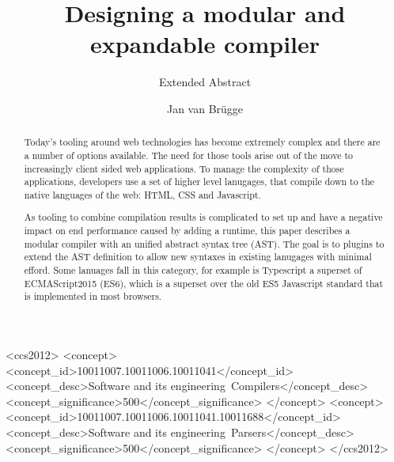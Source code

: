 \documentclass[sigconf, authorversion]{acmart}
\begin{document}
\title{Designing a modular and expandable compiler}
\subtitle{Extended Abstract}

\author{Jan van Br\"ugge}

\begin{abstract}
Today's tooling around web technologies has become extremely complex and there are a number of options available. The need for those tools arise out of the move to increasingly client sided web applications. To manage the complexity of those applications, developers use a set of higher level lanugages, that compile down to the native languages of the web: HTML, CSS and Javascript.

    As tooling to combine compilation results is complicated to set up and have a negative impact on end performance caused by adding a runtime, this paper describes a modular compiler with an unified abstract syntax tree (AST). The goal is to plugins to extend the AST definition to allow new syntaxes in existing lanugages with minimal efford. Some lanuages fall in this category, for example is Typescript a superset of ECMAScript2015 (ES6), which is a superset over the old ES5 Javascript standard that is implemented in most browsers.
\end{abstract}

%
%
\begin{CCSXML}
<ccs2012>
<concept>
<concept_id>10011007.10011006.10011041</concept_id>
<concept_desc>Software and its engineering~Compilers</concept_desc>
<concept_significance>500</concept_significance>
</concept>
<concept>
<concept_id>10011007.10011006.10011041.10011688</concept_id>
<concept_desc>Software and its engineering~Parsers</concept_desc>
<concept_significance>500</concept_significance>
</concept>
</ccs2012>
\end{CCSXML}





\maketitle




 
\end{document}

